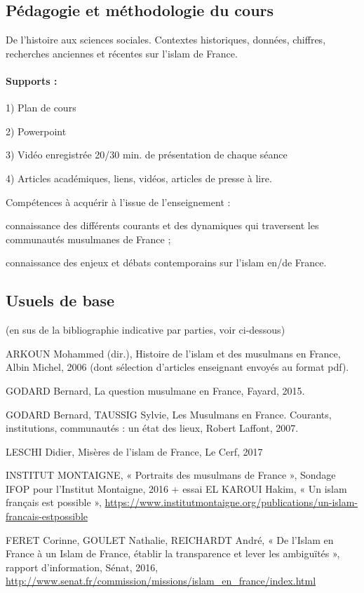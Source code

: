 \subsection{Pédagogie et méthodologie du cours}
De l’histoire aux sciences sociales. Contextes
historiques, données, chiffres, recherches anciennes et récentes sur l’islam de France.

\paragraph{Supports :} 
\bi
\item 1) Plan de cours 
\item 2) Powerpoint 
\item 3) Vidéo enregistrée 20/30 min. de
présentation de chaque séance 
\item 4) Articles académiques, liens, vidéos, articles de presse
à lire.
\ei


Compétences à acquérir à l’issue de l’enseignement : 
\bi
\item connaissance des différents
courants et des dynamiques qui traversent les communautés musulmanes de France ;
\item connaissance des enjeux et débats contemporains sur l’islam en/de France. 
\ei


\subsection{Usuels de base} (en sus de la bibliographie indicative par parties, voir ci-dessous)
\bi
\item ARKOUN Mohammed (dir.), Histoire de l’islam et des musulmans en France, Albin
Michel, 2006 (dont sélection d’articles enseignant envoyés au format pdf).
\item GODARD Bernard, La question musulmane en France, Fayard, 2015.
\item GODARD Bernard, TAUSSIG Sylvie, Les Musulmans en France. Courants,
institutions, communautés : un état des lieux, Robert Laffont, 2007.
\item LESCHI Didier, Misères de l'islam de France, Le Cerf, 2017
\item INSTITUT MONTAIGNE, « Portraits des musulmans de France », Sondage IFOP pour
l’Institut Montaigne, 2016 + essai EL KAROUI Hakim, « Un islam français est
possible », \url{https://www.institutmontaigne.org/publications/un-islam-francais-estpossible}
 \item FERET Corinne, GOULET Nathalie, REICHARDT André, « De l'Islam en France à un
Islam de France, établir la transparence et lever les ambiguïtés », rapport d'information,
Sénat, 2016, \url{http://www.senat.fr/commission/missions/islam_en_france/index.html}
\ei



